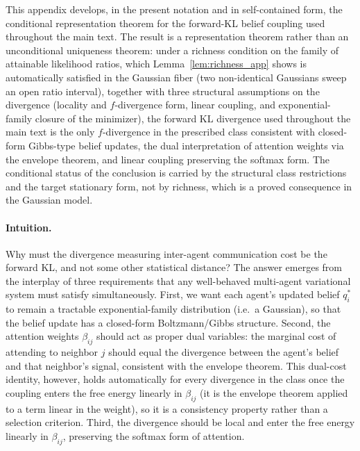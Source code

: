 \documentclass[11pt]{article}
\begin{document}
This appendix develops, in the present notation and in self-contained form, the conditional representation theorem for the forward-KL belief coupling used throughout the main text. The result is a representation theorem rather than an unconditional uniqueness theorem: under a richness condition on the family of attainable likelihood ratios, which Lemma~\ref{lem:richness_app} shows is automatically satisfied in the Gaussian fiber (two non-identical Gaussians sweep an open ratio interval), together with three structural assumptions on the divergence (locality and $f$-divergence form, linear coupling, and exponential-family closure of the minimizer), the forward KL divergence used throughout the main text is the only $f$-divergence in the prescribed class consistent with closed-form Gibbs-type belief updates, the dual interpretation of attention weights via the envelope theorem, and linear coupling preserving the softmax form. The conditional status of the conclusion is carried by the structural class restrictions and the target stationary form, not by richness, which is a proved consequence in the Gaussian model.

\paragraph{Intuition.}
Why must the divergence measuring inter-agent communication cost be the forward KL, and not some other statistical distance? The answer emerges from the interplay of three requirements that any well-behaved multi-agent variational system must satisfy simultaneously. First, we want each agent's updated belief $q_i^*$ to remain a tractable exponential-family distribution (i.e.\ a Gaussian), so that the belief update has a closed-form Boltzmann/Gibbs structure. Second, the attention weights $\beta_{ij}$ should act as proper dual variables: the marginal cost of attending to neighbor $j$ should equal the divergence between the agent's belief and that neighbor's signal, consistent with the envelope theorem. This dual-cost identity, however, holds automatically for every divergence in the class once the coupling enters the free energy linearly in $\beta_{ij}$ (it is the envelope theorem applied to a term linear in the weight), so it is a consistency property rather than a selection criterion. Third, the divergence should be local and enter the free energy linearly in $\beta_{ij}$, preserving the softmax form of attention.
\end{document}
